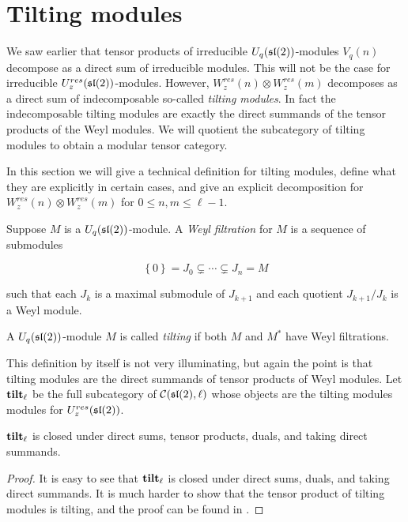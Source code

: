 \section{Tilting modules} 
\label{section:Tilting}

We saw earlier that tensor products of irreducible $U_q(\mathfrak{sl}(2))$-modules
$V_q(n)$ decompose as a direct sum of irreducible modules. This will not be the
case for irreducible $U_z^{res}(\mathfrak{sl}(2))$-modules. However,
$W_z^{res}(n)\otimes W_z^{res}(m)$ decomposes as a direct sum of indecomposable
so-called \emph{tilting modules}. In fact the indecomposable tilting modules are exactly
the direct summands of the tensor products of the Weyl modules. We will
quotient the subcategory of tilting modules to obtain a modular tensor
category. 

In this section we will give a technical definition for tilting modules, define
what they are explicitly in certain cases, and give an explicit decomposition
for $W^{res}_z(n) \otimes W_z^{res}(m)$ for $0 \leq n,m \leq \ell - 1$.

\begin{defn}
    Suppose $M$ is a $U_q(\mathfrak{sl}(2))$-module. A \emph{Weyl filtration} for $M$
    is a sequence of submodules 

    \begin{equation}
        \left\{ 0 \right\} = J_0 \subsetneq \cdots \subsetneq J_n = M
    \end{equation}

    such that each $J_k$ is a maximal submodule of $J_{k+1}$ and each quotient $J_{k+1}/J_k$ is a Weyl module. 
\end{defn}

\begin{defn}
    A $U_q(\mathfrak{sl}(2))$-module $M$ is called \emph{tilting} if both $M$ and $M^*$ have Weyl filtrations.
\end{defn}

This definition by itself is not very illuminating, but again the point is that
tilting modules are the direct summands of tensor products of Weyl modules.
Let $\mathbf{tilt}_\ell$ be the full subcategory of $\mathcal{C}(\mathfrak{sl}(2), \ell)$ whose
objects are the tilting modules modules for $U_z^{res}(\mathfrak{sl}(2))$.  

\begin{prop}
    \label{prop:tiltingclosed}
    $\mathbf{tilt}_\ell$ is closed under direct sums, tensor products, duals, and taking direct summands.
\end{prop}
\begin{proof}
    It is easy to see that $\mathbf{tilt}_\ell$ is closed under direct sums, duals, and
    taking direct summands. It is much harder to show that the tensor product
    of tilting modules is tilting, and the proof can be found in \cite{Andersen1992}.
\end{proof}

